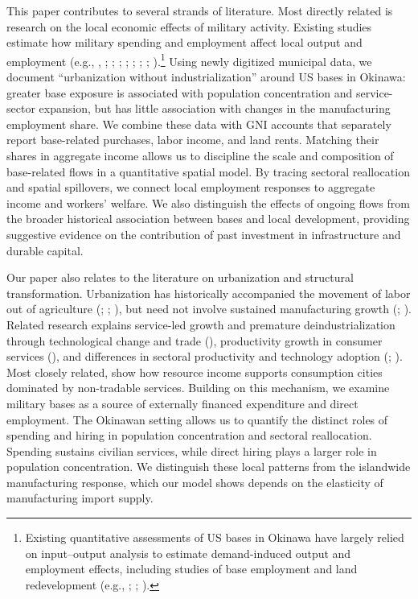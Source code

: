 \documentclass[12pt, unicode, a4paper]{article}
\newcommand{\1}{\mbox{1}\hspace{-0.25em}\mbox{l}} %
\begin{document}



This paper contributes to several strands of literature. Most directly related is research on the local economic effects of military activity.
Existing studies estimate how military spending and employment affect local output and employment (e.g., \citealt{hooker1997effects}, \citeyear{hooker2001measuring}; \citealt{paloyo2010regional}; \citealt{nakamura2014fiscal}; \citealt{lee2018regional}; \citealt{zou2018local}; \citealt{biolsi2019local}; \citealt{dahlberg2024coping}; \citealt{brunet2026stimulus}).\footnote{
Existing quantitative assessments of US bases in Okinawa have largely relied on input--output analysis to estimate demand-induced output and employment effects, including studies of base employment and land redevelopment (e.g., \citealt{okinawa07}; \citealt{kusuyama12}; \citealt{tomikawa18}).}
Using newly digitized municipal data, we document ``urbanization without industrialization'' around US bases in Okinawa: greater base exposure is associated with population concentration and service-sector expansion, but has little association with changes in the manufacturing employment share. We combine these data with GNI accounts that separately report base-related purchases, labor income, and land rents. Matching their shares in aggregate income allows us to discipline the scale and composition of base-related flows in a quantitative spatial model. By tracing sectoral reallocation and spatial spillovers, we connect local employment responses to aggregate income and workers' welfare. We also distinguish the effects of ongoing flows from the broader historical association between bases and local development, providing suggestive evidence on the contribution of past investment in infrastructure and durable capital.

Our paper also relates to the literature on urbanization and structural transformation. Urbanization has historically accompanied the movement of labor out of agriculture (\citealt{kuznets1973modern}; \citealt{michaels2012urbanization}; \citealt{bryan2025spatial}), but need not involve sustained manufacturing growth (\citealt{jedwab2015urbanization}; \citealt{henderson2020urbanization}). Related research explains service-led growth and premature deindustrialization through technological change and trade (\citealt{rodrik2016premature}), productivity growth in consumer services (\citealt{fan2023india}), and differences in sectoral productivity and technology adoption (\citealt{huneeus2023heterogeneous}; \citealt{fujiwara2024premature}). Most closely related, \citet{gollin2016urbanization} show how resource income supports consumption cities dominated by non-tradable services. Building on this mechanism, we examine military bases as a source of externally financed expenditure and direct employment. The Okinawan setting allows us to quantify the distinct roles of spending and hiring in population concentration and sectoral reallocation. Spending sustains civilian services, while direct hiring plays a larger role in population concentration. We distinguish these local patterns from the islandwide manufacturing response, which our model shows depends on the elasticity of manufacturing import supply.
\end{document}
